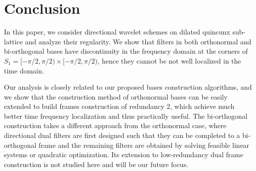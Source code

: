 \section{Conclusion}\label{sec: end}
In this paper, we consider directional wavelet schemes on dilated quincunx sub-lattice and analyze their regularity. We show that filters in both orthonormal and bi-orthogonal bases have discontinuity in the frequency domain at the corners of $S_1 = [-\pi/2,\pi/2)\times[-\pi/2,\pi/2)$, hence they cannot be not well localized in the time domain. 

Our analysis is closely related to our proposed bases construction algorithms, and we show that the construction method of orthonormal bases can be easily extended to build frames construction of redundancy 2, which achieve much better time frequency localization and thus practically useful. The bi-orthogonal construction takes a different approach from the orthonormal case, where directional dual filters are first designed such that they can be completed to a bi-orthogonal frame and the remaining filters are obtained by solving feasible linear systems or quadratic optimization. Its extension to low-redundancy dual frame construction is not studied here and will be our future focus.